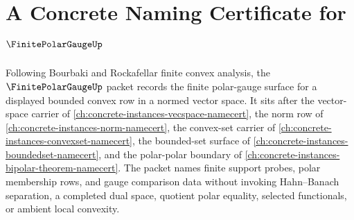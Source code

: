 \chapter{A Concrete Naming Certificate for $\FinitePolarGaugeUp$}
\label{ch:concrete-instances-finite-polar-gauge-namecert}

Following Bourbaki and Rockafellar finite convex analysis, the $\FinitePolarGaugeUp$ packet records the finite polar-gauge surface for a displayed bounded convex row in a normed vector space. It sits after the vector-space carrier of \autoref{ch:concrete-instances-vecspace-namecert}, the norm row of \autoref{ch:concrete-instances-norm-namecert}, the convex-set carrier of \autoref{ch:concrete-instances-convexset-namecert}, the bounded-set surface of \autoref{ch:concrete-instances-boundedset-namecert}, and the polar-polar boundary of \autoref{ch:concrete-instances-bipolar-theorem-namecert}. The packet names finite support probes, polar membership rows, and gauge comparison data without invoking Hahn--Banach separation, a completed dual space, quotient polar equality, selected functionals, or ambient local convexity.


